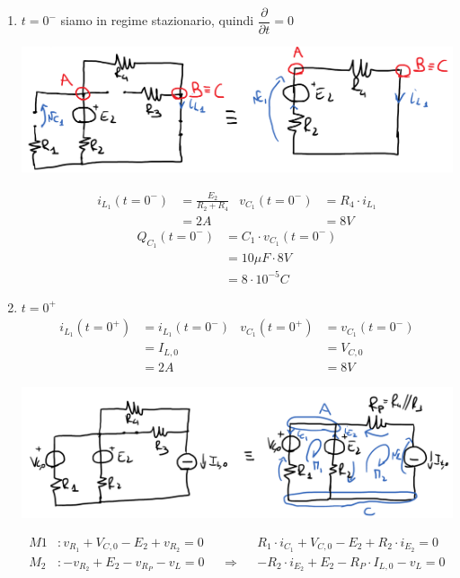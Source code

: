 \documentclass{article}
\begin{document}
\begin{enumerate}[label=\protect\circled{\arabic*}]
    \item $t=0^-$ siamo in regime stazionario, quindi $\dfrac{\partial}{\partial t}=0$
    \begin{center}
        \includegraphics[scale=0.2]{Image/Es_3_Trans_1.png}
    \end{center}
    \begin{align*}
        i_{L_1}(t=0^-) &=\frac{E_2}{R_2+R_4} & v_{C_1} (t=0^-) &=R_4\cdot i_{L_1} \\
        &= 2A & &=8V
    \end{align*}
    \begin{align*}
        Q_{C_1}(t=0^-) &=C_1 \cdot v_{C_1}(t=0^-)\\
        &=10\mu F \cdot 8V \\
        &=8\cdot 10^{-5}C
    \end{align*}
    \item $t=0^+$
    \begin{align*}
        i_{L_1}(t=0^+) &= i_{L_1}(t=0^-) & v_{C_1}(t=0^+) &= v_{C_1}(t=0^-)\\
        &=I_{L,0} & &=V_{C,0}\\
        &=2A & &=8V
    \end{align*}
    \begin{center}
        \includegraphics[scale=0.2]{Image/Es_3_Trans_2.png}
    \end{center}
    \begin{align*}
       M1&:v_{R_1}+V_{C,0} - E_2 + v_{R_2}=0 & & & &R_1\cdot i_{C_1} + V_{C,0}-E_2+R_2\cdot i_{E_2}=0\\
        M_2&:-v_{R_2}+E_2-v_{R_P}-v_L=0 & &\Rightarrow & & -R_2\cdot i_{E_2}+E_2-R_P\cdot I_{L,0}-v_L=0\\

\end{align*}
\end{enumerate}
\end{document}
